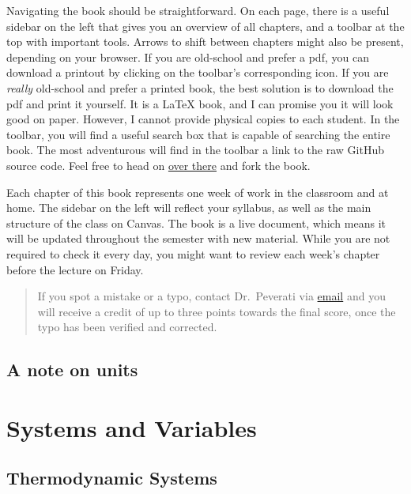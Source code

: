 \documentclass[
]{book}
\theoremstyle{definition}
\theoremstyle{definition}
\theoremstyle{definition}
\theoremstyle{remark}
\begin{document}
Navigating the book should be straightforward. On each page, there is a useful sidebar on the left that gives you an overview of all chapters, and a toolbar at the top with important tools. Arrows to shift between chapters might also be present, depending on your browser. If you are old-school and prefer a pdf, you can download a printout by clicking on the toolbar's corresponding icon. If you are \emph{really} old-school and prefer a printed book, the best solution is to download the pdf and print it yourself. It is a LaTeX book, and I can promise you it will look good on paper. However, I cannot provide physical copies to each student. In the toolbar, you will find a useful search box that is capable of searching the entire book. The most adventurous will find in the toolbar a link to the raw GitHub source code. Feel free to head on \href{https://github.com/peverati/PChem1}{over there} and fork the book.

Each chapter of this book represents one week of work in the classroom and at home. The sidebar on the left will reflect your syllabus, as well as the main structure of the class on Canvas. The book is a live document, which means it will be updated throughout the semester with new material. While you are not required to check it every day, you might want to review each week's chapter before the lecture on Friday.

\begin{quote}
If you spot a mistake or a typo, contact Dr.~Peverati via \href{mailto:rpeverati@fit.edu}{email} and you will receive a credit of up to three points towards the final score, once the typo has been verified and corrected.
\end{quote}

\hypertarget{a-note-on-units}{%
\section*{A note on units}\label{a-note-on-units}}

\hypertarget{SystemVariables}{%
\chapter{Systems and Variables}\label{SystemVariables}}

\hypertarget{thermodynamic-systems}{%
\section{Thermodynamic Systems}\label{thermodynamic-systems}}
\end{document}

